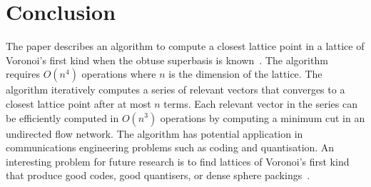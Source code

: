 \documentclass[final,leqno]{siamltex}
\begin{document}

\section{Conclusion}

The paper describes an algorithm to compute a closest lattice point in a lattice of Voronoi's first kind when the obtuse superbasis is known~\cite{ConwaySloane1992_voronoi_lattice_3d_obtuse_superbases}.  The algorithm requires $O(n^4)$ operations where $n$ is the dimension of the lattice.  The algorithm iteratively computes a series of relevant vectors that converges to a closest lattice point after at most $n$ terms.   Each relevant vector in the series can be efficiently computed in $O(n^3)$ operations by computing a minimum cut in an undirected flow network.  The algorithm has potential application in communications engineering problems such as coding and quantisation.  An interesting problem for future research is to find lattices of Voronoi's first kind that produce good codes, good quantisers, or dense sphere packings~\cite{SPLAG,Conway1982VoronoiRegions}.


\end{document}
